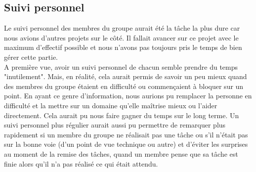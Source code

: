 \documentclass[t, 12pt, usenames,dvipsnames]{article}
\begin{document}
     \subsection{Suivi personnel}
     \noindent Le suivi personnel des membres du groupe aurait été la tâche la plus dure car nous avions d'autres projets sur le côté. Il fallait avancer sur ce projet avec le maximum d'effectif possible et nous n'avons pas toujours pris le temps de bien gérer cette partie.  \\
     A première vue, avoir un suivi personnel de chacun semble prendre du temps "inutilement". Mais, en réalité, cela aurait permis de savoir un peu mieux quand des membres du groupe étaient en difficulté ou commençaient à bloquer sur un point. En ayant ce genre d'information, nous aurions pu remplacer la personne en difficulté et la mettre sur un domaine qu'elle maîtrise mieux ou l'aider directement. Cela aurait pu nous faire gagner du temps sur le long terme. Un suivi personnel plus régulier aurait aussi pu permettre de remarquer plus rapidement si un membre du groupe ne réalisait pas une tâche ou s'il n'était pas sur la bonne voie (d'un point de vue technique ou autre) et d'éviter les surprises au moment de la remise des tâches, quand un membre pense que sa tâche est finie alors qu'il n'a pas réalisé ce qui était attendu.
\end{document}
